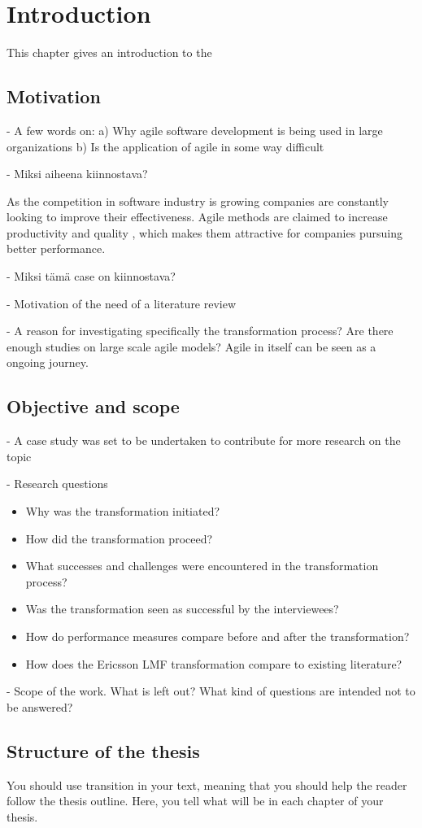 
\chapter{Introduction}
\label{chapter:intro}

This chapter gives an introduction to the

\section{Motivation}

- A few words on:
a) Why agile software development is being used in large organizations
b) Is the application of agile in some way difficult

- Miksi aiheena kiinnostava?

As the competition in software industry is growing companies are constantly
looking to improve their effectiveness. Agile methods are claimed to increase
productivity and quality \cite{Livermore2008}, which makes them attractive
for companies pursuing better performance.

- Miksi tämä case on kiinnostava?

- Motivation of the need of a literature review

- A reason for investigating specifically the transformation process? Are there
enough studies on large scale agile models? Agile in itself can be seen as a
ongoing journey.

\section{Objective and scope}

- A case study was set to be undertaken to contribute for more research on the topic

- Research questions

\begin{itemize}
  \item Why was the transformation initiated?
  \item How did the transformation proceed?
  \item What successes and challenges were encountered in the transformation
        process?
  \item Was the transformation seen as successful by the interviewees?
  \item How do performance measures compare before and after the transformation?
  \item How does the Ericsson LMF transformation compare to existing literature?
\end{itemize}

- Scope of the work.
What is left out?
What kind of questions are intended not to be answered?


\section{Structure of the thesis}

You should use transition in your text, meaning that you should help
the reader follow the thesis outline. Here, you tell what will be in
each chapter of your thesis. 

